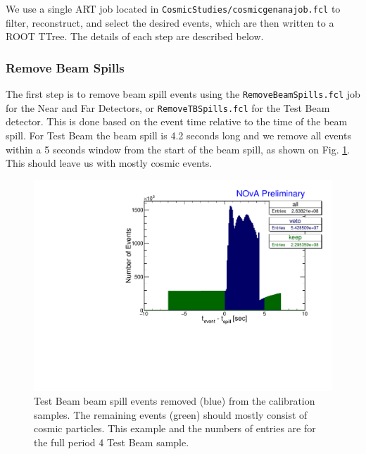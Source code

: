 \documentclass[12pt]{article}
\begin{document}
We use a single ART job located in \texttt{CosmicStudies/cosmicgenanajob.fcl} to filter, reconstruct, and select the desired events, which are then written to a ROOT TTree. The details of each step are described below.

\subsubsection{Remove Beam Spills}
The first step is to remove beam spill events using the \texttt{RemoveBeamSpills.fcl} job for the Near and Far Detectors, or \texttt{RemoveTBSpills.fcl} for the Test Beam detector. This is done based on the event time relative to the time of the beam spill. For Test Beam the beam spill is 4.2 seconds long and we remove all events within a 5 seconds window from the start of the beam spill, as shown on Fig. \ref{figRemoveTBSpills}. This should leave us with mostly cosmic events.

\begin{figure}[hbtp]
\centering
\includegraphics[width=\textwidth]{RemoveTBSpills.pdf}
\caption{Test Beam beam spill events removed (blue) from the calibration samples. The remaining events (green) should mostly consist of cosmic particles. This example and the numbers of entries are for the full period 4 Test Beam sample.}
\label{figRemoveTBSpills}
\end{figure}
\end{document}
